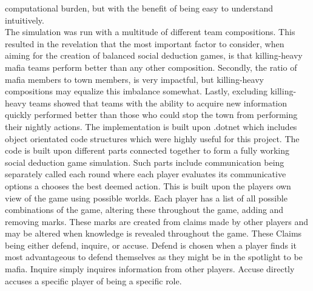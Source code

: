 computational burden, but with the benefit of being easy to understand
intuitively. \\
The simulation was run with a multitude of different team compositions. This
resulted in the revelation that the most important factor to consider, when
aiming for the creation of balanced social deduction games, is that killing-heavy mafia teams perform better than any other composition. Secondly, the ratio of mafia members to town members, is very impactful, but killing-heavy compositions may equalize this imbalance somewhat. Lastly, excluding killing-heavy teams showed that teams with the ability to acquire new information quickly performed better than those who could stop the town from performing their nightly actions.
The implementation is built upon .dotnet which includes object orientated code
structures which were highly useful for this project. The code is built upon
different parts connected together to form a fully working social deduction game simulation.
Such parts include communication being separately called each round where each player
evaluates its communicative options a chooses the best deemed action.
This is built upon the players own view of the game using possible
worlds. Each player has a list of all possible combinations of the game, altering these throughout the game, adding and removing marks. These marks are
created from claims made by other players and may be altered when knowledge is revealed
throughout the game. These Claims being either defend, inquire, or accuse. Defend is chosen when a player finds it most advantageous to defend themselves as they might
be in the spotlight to be mafia. Inquire simply inquires information from other
players. Accuse directly accuses a specific player of being a
specific role.
\twocolumn